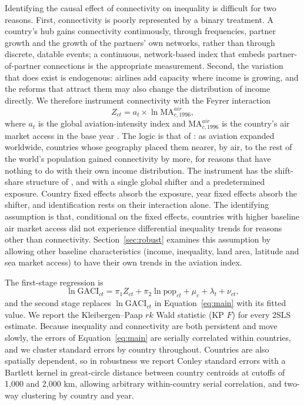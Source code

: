 Identifying the causal effect of connectivity on inequality is difficult for two reasons. First, connectivity is poorly represented by a binary treatment. A country's hub gains connectivity continuously, through frequencies, partner growth and the growth of the partners' own networks, rather than through discrete, datable events; a continuous, network-based index that embeds partner-of-partner connections is the appropriate measurement. Second, the variation that does exist is endogenous: airlines add capacity where income is growing, and the reforms that attract them may also change the distribution of income directly. We therefore instrument connectivity with the Feyrer interaction
\begin{equation}
Z_{ct} = a_t \times \ln\mathrm{MA}^{air}_{c,1996},
\label{eq:iv}
\end{equation}
where $a_t$ is the global aviation-intensity index and $\mathrm{MA}^{air}_{c,1996}$ is the country's air market access in the base year \citep{Feyrer_2019}. The logic is that of \citet{Feyrer_2019}: as aviation expanded worldwide, countries whose geography placed them nearer, by air, to the rest of the world's population gained connectivity by more, for reasons that have nothing to do with their own income distribution. The instrument has the shift-share structure of \citet{GoldsmithPinkham_2020}, \citet{Adao_2019} and \citet{Borusyak_2022} with a single global shifter and a predetermined exposure. Country fixed effects absorb the exposure, year fixed effects absorb the shifter, and identification rests on their interaction alone. The identifying assumption is that, conditional on the fixed effects, countries with higher baseline air market access did not experience differential inequality trends for reasons other than connectivity. Section~\ref{sec:robust} examines this assumption by allowing other baseline characteristics (income, inequality, land area, latitude and sea market access) to have their own trends in the aviation index.

The first-stage regression is
\begin{equation}
\ln\mathrm{GACI}_{ct} = \pi_1 Z_{ct} + \pi_2 \ln\text{pop}_{ct} + \mu_c + \lambda_t + \nu_{ct},
\label{eq:first}
\end{equation}
and the second stage replaces $\ln\mathrm{GACI}_{ct}$ in Equation~\eqref{eq:main} with its fitted value. We report the Kleibergen--Paap $rk$ Wald statistic (KP $F$) for every 2SLS estimate. Because inequality and connectivity are both persistent and move slowly, the errors of Equation~\eqref{eq:main} are serially correlated within countries, and we cluster standard errors by country throughout. Countries are also spatially dependent, so in robustness we report Conley standard errors \citep{Conley_1999} with a Bartlett kernel in great-circle distance between country centroids at cutoffs of 1{,}000 and 2{,}000 km, allowing arbitrary within-country serial correlation, and two-way clustering by country and year.


